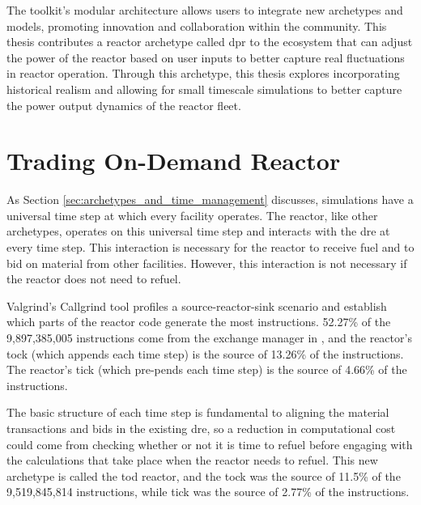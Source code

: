 The toolkit’s modular architecture allows users to integrate new archetypes and models, promoting innovation and collaboration within the \cyclus community. This thesis contributes a reactor archetype called \gls{dpr} to the ecosystem that can adjust the power of the reactor based on user inputs to better capture real fluctuations in reactor operation. Through this archetype, this thesis explores incorporating historical realism and allowing for small timescale simulations to better capture the power output dynamics of the reactor fleet.

\section{Trading On-Demand Reactor}
\label{sec:trading_reactor}

As Section \ref{sec:archetypes_and_time_management} discusses, \cyclus simulations have a universal time step at which every facility operates. The \cycamore reactor, like other archetypes, operates on this universal time step and interacts with the \gls{dre} at every time step. This interaction is necessary for the reactor to receive fuel and to bid on material from other facilities. However, this interaction is not necessary if the reactor does not need to refuel.

Valgrind's \cite{valgrind} Callgrind \cite{callgrind} tool profiles a source-reactor-sink scenario and establish which parts of the \cycamore reactor code generate the most instructions. 52.27\% of the 9,897,385,005 instructions come from the exchange manager in \cyclus, and the reactor's tock (which appends each time step) is the source of 13.26\% of the instructions. The reactor's tick (which pre-pends each time step) is the source of 4.66\% of the instructions.

The basic structure of each time step is fundamental to aligning the material transactions and bids in the existing \gls{dre}, so a reduction in computational cost could come from checking whether or not it is time to refuel before engaging with the calculations that take place when the reactor needs to refuel. This new archetype is called the \gls{tod} reactor, and the tock was the source of 11.5\% of the 9,519,845,814 instructions, while tick was the source of 2.77\% of the instructions.

